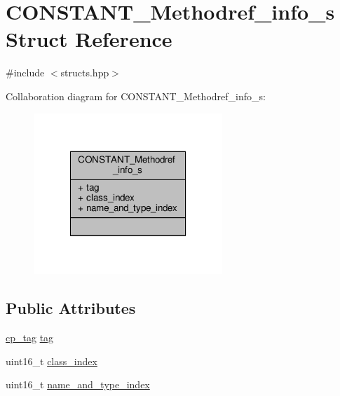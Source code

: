 \hypertarget{structCONSTANT__Methodref__info__s}{\section{C\+O\+N\+S\+T\+A\+N\+T\+\_\+\+Methodref\+\_\+info\+\_\+s Struct Reference}
\label{structCONSTANT__Methodref__info__s}
}


{\ttfamily \#include $<$structs.\+hpp$>$}



Collaboration diagram for C\+O\+N\+S\+T\+A\+N\+T\+\_\+\+Methodref\+\_\+info\+\_\+s\+:\nopagebreak
\begin{figure}[H]
\begin{center}
\leavevmode
\includegraphics[width=202pt]{structCONSTANT__Methodref__info__s__coll__graph}
\end{center}
\end{figure}
\subsection*{Public Attributes}
\begin{DoxyCompactItemize}
\item 
\hyperlink{structs_8hpp_a17947ec3f3c1f2392eabd36c1ba5fec6}{cp\+\_\+tag} \hyperlink{structCONSTANT__Methodref__info__s_ac808580c07823c6e5413491b0b297a20}{tag}
\item 
uint16\+\_\+t \hyperlink{structCONSTANT__Methodref__info__s_a20509be0dbe4f181a490951022b76113}{class\+\_\+index}
\item 
uint16\+\_\+t \hyperlink{structCONSTANT__Methodref__info__s_ac669a727a4485e90f35bffd37888b7d2}{name\+\_\+and\+\_\+type\+\_\+index}
\end{DoxyCompactItemize}


